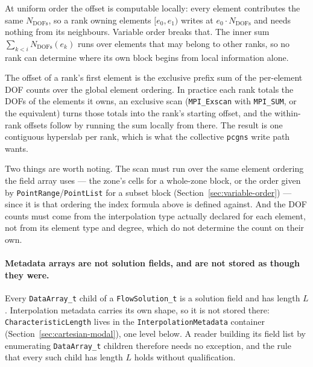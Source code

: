 \documentclass[11pt,letterpaper]{article}
\newif\ifvfourdraft
\newcommand{\vfourmark}{\ifvfourdraft\textcolor{v4violet}{\textbf{[v4]}}\ \fi}
\begin{document}
At uniform order the offset is computable locally: every element contributes the
same $N_\mathrm{DOFs}$, so a rank owning elements $[e_0, e_1)$ writes at
$e_0 \cdot N_\mathrm{DOFs}$ and needs nothing from its neighbours.  Variable order
breaks that.  The inner sum $\sum_{k<i} N_\mathrm{DOFs}(e_k)$ runs over elements
that may belong to other ranks, so no rank can determine where its own block
begins from local information alone.

The offset of a rank's first element is the exclusive prefix sum of the
per-element DOF counts over the global element ordering.  In practice each rank
totals the DOFs of the elements it owns, an exclusive scan
(\texttt{MPI\_Exscan} with \texttt{MPI\_SUM}, or the equivalent) turns those
totals into the rank's starting offset, and the within-rank offsets follow by
running the sum locally from there.  The result is one contiguous hyperslab per
rank, which is what the collective \texttt{pcgns} write path wants.

Two things are worth noting.  The scan must run over the same element ordering
the field array uses --- the zone's cells for a whole-zone block, or the order
given by \texttt{PointRange}/\texttt{PointList} for a subset block
(Section~\ref{sec:variable-order}) --- since it is that ordering the index
formula above is defined against.  And the DOF counts must come from the
interpolation type actually declared for each element, not from its element type
and degree, which do not determine the count on their own.

\paragraph{\vfourmark Metadata arrays are not solution fields, and are not stored
as though they were.}
Every \texttt{DataArray\_t} child of a \texttt{FlowSolution\_t} is a solution field
and has length $L$.  Interpolation metadata carries its own shape, so it is not
stored there: \texttt{CharacteristicLength} lives in the
\texttt{InterpolationMetadata} container (Section~\ref{sec:cartesian-modal}), one
level below.  A reader building its field list by enumerating
\texttt{DataArray\_t} children therefore needs no exception, and the rule that
every such child has length $L$ holds without qualification.
\end{document}
